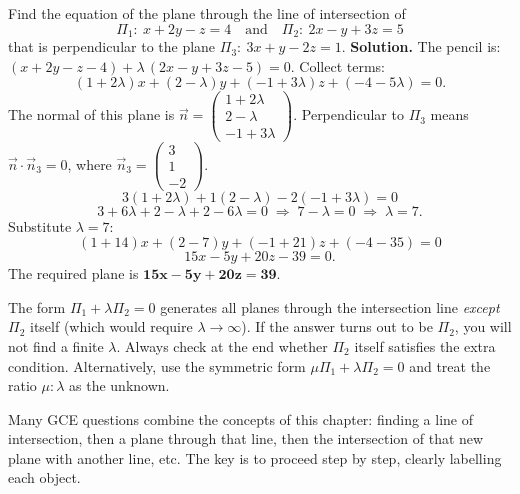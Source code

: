 \documentclass[11pt]{article}
\newcounter{popsec}
\newcounter{popsub}
\newcommand{\courssub}[1]{%
  \stepcounter{popsub}%
  \par\vspace{9pt}\noindent{\popxbold\fontsize{11.5}{13}\selectfont\color{popink}{\color{poporange}\thepopsec.\thepopsub}\hspace{6pt}#1}\par\nopagebreak\vspace{4pt}
}
\begin{document}
\begin{exoresolu}
Find the equation of the plane through the line of intersection of
\[ \Pi_1:\ x + 2y - z = 4 \quad\text{and}\quad \Pi_2:\ 2x - y + 3z = 5 \]
that is perpendicular to the plane $\Pi_3:\ 3x + y - 2z = 1$.
\tcblower
\textbf{Solution.}
The pencil is: $(x + 2y - z - 4) + \lambda\,(2x - y + 3z - 5) = 0$.
Collect terms:
\[ (1+2\lambda)x + (2-\lambda)y + (-1+3\lambda)z + (-4-5\lambda) = 0. \]
The normal of this plane is $\vec{n} = \begin{pmatrix} 1+2\lambda \\ 2-\lambda \\ -1+3\lambda \end{pmatrix}$.
Perpendicular to $\Pi_3$ means $\vec{n} \cdot \vec{n}_3 = 0$, where $\vec{n}_3 = \begin{pmatrix} 3 \\ 1 \\ -2 \end{pmatrix}$.
\[ 3(1+2\lambda) + 1(2-\lambda) - 2(-1+3\lambda) = 0 \]
\[ 3 + 6\lambda + 2 - \lambda + 2 - 6\lambda = 0 \;\Longrightarrow\; 7 - \lambda = 0 \;\Longrightarrow\; \lambda = 7. \]
Substitute $\lambda = 7$:
\[ (1+14)x + (2-7)y + (-1+21)z + (-4-35) = 0 \]
\[ 15x - 5y + 20z - 39 = 0. \]
The required plane is $\mathbf{15x - 5y + 20z = 39}$.
\end{exoresolu}

\begin{attention}
The form $\Pi_1 + \lambda\Pi_2 = 0$ generates all planes through the intersection line \emph{except} $\Pi_2$ itself (which would require $\lambda \to \infty$). If the answer turns out to be $\Pi_2$, you will not find a finite $\lambda$. Always check at the end whether $\Pi_2$ itself satisfies the extra condition. Alternatively, use the symmetric form $\mu\Pi_1 + \lambda\Pi_2 = 0$ and treat the ratio $\mu:\lambda$ as the unknown.
\end{attention}

\courssub{Synthesis Problems}

Many GCE questions combine the concepts of this chapter: finding a line of intersection, then a plane through that line, then the intersection of that new plane with another line, etc. The key is to proceed step by step, clearly labelling each object.
\end{document}
